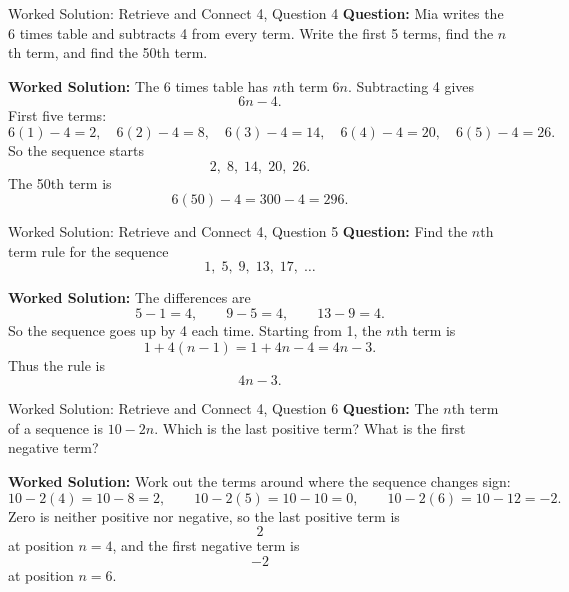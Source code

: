 \documentclass{beamer}
\begin{document}
\begin{frame}{Worked Solution: Retrieve and Connect 4, Question 4}
\textbf{Question:} Mia writes the 6 times table and subtracts 4 from every term. Write the first 5 terms, find the $n$th term, and find the 50th term.

\textbf{Worked Solution:} The 6 times table has $n$th term $6n$. Subtracting 4 gives
\[
6n-4.
\]
First five terms:
\[
6(1)-4=2,\quad 6(2)-4=8,\quad 6(3)-4=14,\quad 6(4)-4=20,\quad 6(5)-4=26.
\]
So the sequence starts
\[
2,\;8,\;14,\;20,\;26.
\]
The 50th term is
\[
6(50)-4=300-4=296.
\]
\end{frame}

\begin{frame}{Worked Solution: Retrieve and Connect 4, Question 5}
\textbf{Question:} Find the $n$th term rule for the sequence
\[
1,\;5,\;9,\;13,\;17,\;\ldots
\]

\textbf{Worked Solution:} The differences are
\[
5-1=4,\qquad 9-5=4,\qquad 13-9=4.
\]
So the sequence goes up by 4 each time. Starting from 1, the $n$th term is
\[
1+4(n-1)=1+4n-4=4n-3.
\]
Thus the rule is
\[
4n-3.
\]
\end{frame}

\begin{frame}{Worked Solution: Retrieve and Connect 4, Question 6}
\textbf{Question:} The $n$th term of a sequence is $10-2n$. Which is the last positive term? What is the first negative term?

\textbf{Worked Solution:} Work out the terms around where the sequence changes sign:
\[
10-2(4)=10-8=2,\qquad 10-2(5)=10-10=0,\qquad 10-2(6)=10-12=-2.
\]
Zero is neither positive nor negative, so the last positive term is
\[
2
\]
at position $n=4$, and the first negative term is
\[
-2
\]
at position $n=6$.
\end{frame}
\end{document}
